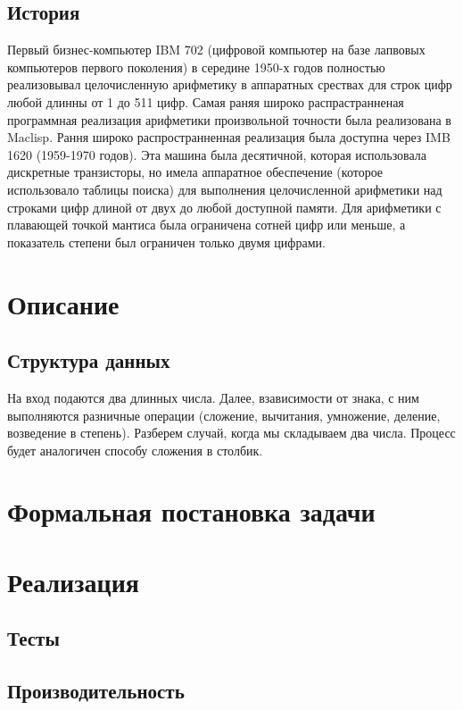 \documentclass[a4paper]{article}
\begin{document}
\subsection{История}
Первый бизнес-компьютер IBM 702 (цифровой компьютер на базе лапвовых компьютеров первого поколения) в середине 1950-х годов полностью реализовывал целочисленную арифметику в аппаратных срествах для строк цифр любой длинны от 1 до 511 цифр. Самая раняя широко распрастранненая программная реализация арифметики произвольной точности была реализована в Maclisp. 
Рання широко распространненная реализация была доступна через IMB 1620 (1959-1970 годов). Эта машина была десятичной, которая использовала дискретные транзисторы, но имела аппаратное обеспечение (которое использовало таблицы поиска) для выполнения целочисленной арифметики над строками цифр длиной от двух до любой доступной памяти. Для арифметики с плавающей точкой мантиса была ограничена сотней цифр или меньше, а показатель степени был ограничен только двумя цифрами. 
\newpage

\section{Описание}
\subsection{Структура данных}
На вход подаются два длинных числа. Далее, взависимости от знака, с ним выполняются разничные операции (сложение, вычитания, умножение, деление, возведение в степень).
Разберем случай, когда мы складываем два числа. Процесс будет аналогичен способу сложения в столбик.
\newpage

\section{Формальная постановка задачи}
\newpage

\section{Реализация}
\subsection{Тесты}
\subsection{Производительность}
\newpage
\end{document}
